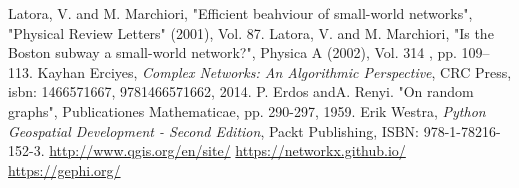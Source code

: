 \documentclass[14pt, oneside, a4paper, openany]{scrartcl}
\begin{document}
\begin{thebibliography}{9}
	 Latora, V. and M. Marchiori,
	 "Efficient beahviour of small-world networks",
	 "Physical Review Letters" (2001), Vol. 87.
	 Latora, V. and M. Marchiori, 
	 "Is the Boston subway a small-world network?",
	 Physica A (2002), Vol. 314 , pp. 109–113.
	 Kayhan Erciyes,
	 \textit{Complex Networks: An Algorithmic Perspective},
	 CRC Press, isbn: 1466571667, 9781466571662, 2014.
	 P. Erdos andA. Renyi.
	 "On random graphs",
	 Publicationes Mathematicae, pp. 290-297, 1959.
	  Erik Westra,
	 \textit{Python Geospatial Development - Second Edition},
	 Packt Publishing, ISBN: 978-1-78216-152-3.
	 \href{http://www.qgis.org/en/site/}{http://www.qgis.org/en/site/}
	 \href{https://networkx.github.io/}{https://networkx.github.io/}
	 \href{https://gephi.org/}{https://gephi.org/}
	 
\end{thebibliography}
\end{document}

